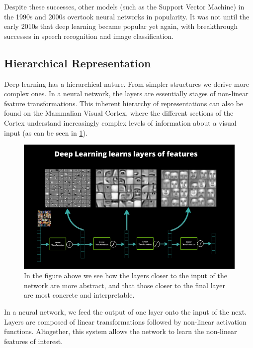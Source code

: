 Despite these successes, other models (such as the Support Vector Machine) in the 1990s and 2000s overtook neural networks in popularity.
It was not until the early 2010s that deep learning became popular yet again, with breakthrough successes in speech recognition and image classification.

\subsection{Hierarchical Representation}\label{ssec:hierarchical-representation}

Deep learning has a hierarchical nature.
From simpler structures we derive more complex ones.
In a neural network, the layers are essentially stages of non-linear feature transformations.
This inherent hierarchy of representations can also be found on the Mammalian Visual Cortex, where the different sections of the Cortex understand increasingly complex levels of information about a visual input (as can be seen in \cref{fig:deep-learning-hierarchical-features}).

\begin{figure}[ht]
\centering
\includegraphics[width=0.85\linewidth]{lectures/01-a/dl_features.png}
\caption{In the figure above we see how the layers closer to the input of the network are more abstract, and that those closer to the final layer are most concrete and interpretable.}
\label{fig:deep-learning-hierarchical-features}
\end{figure}

In a neural network, we feed the output of one layer onto the input of the next.
Layers are composed of linear transformations followed by non-linear activation functions.
Altogether, this system allows the network to learn the non-linear features of interest.

